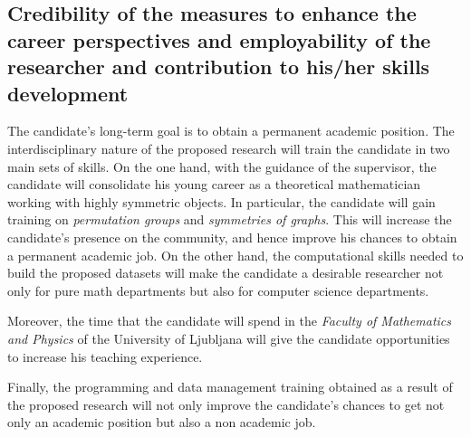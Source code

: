 \subsection{Credibility of the measures to enhance the career perspectives and employability of the researcher and contribution to his/her skills development}
\label{sec:impactresearcher}

The candidate's long-term goal is to obtain a permanent academic position.
The interdisciplinary nature of the proposed research will train the candidate in two main sets of skills.
On the one hand, with the guidance of the supervisor, the candidate will consolidate his young career as a theoretical mathematician working with highly symmetric objects. In particular, the candidate will gain training on \emph{permutation groups} and \emph{symmetries of graphs}. This will increase the candidate's presence on the community, and hence improve his chances to obtain a permanent academic job.
On the other hand, the computational skills needed to build the proposed datasets will make the candidate a desirable researcher not only for pure math departments but also for computer science departments.

Moreover, the time that the candidate will spend in the \emph{Faculty of Mathematics and Physics} of the University of Ljubljana will give the candidate opportunities to increase his teaching experience.

Finally, the programming and data management training obtained as a result of the proposed research will not only improve the candidate's chances to get not only an academic position but also a non academic job.
